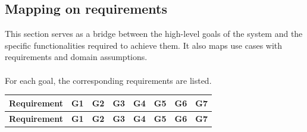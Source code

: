 \subsection{Mapping on requirements}
This section serves as a bridge between the high-level goals of the system and the specific functionalities required to achieve them. It also maps use cases with requirements and domain assumptions.\\\\

For each goal, the corresponding requirements are listed.
\begin{longtable}{lccccccc}
    \hline
    \textbf{Requirement} & \textbf{G1} & \textbf{G2} & \textbf{G3} & \textbf{G4} & \textbf{G5} & \textbf{G6} & \textbf{G7} \\ \hline
    \endfirsthead
    
    \hline
    \textbf{Requirement} & \textbf{G1} & \textbf{G2} & \textbf{G3} & \textbf{G4} & \textbf{G5} & \textbf{G6} & \textbf{G7} \\ \hline
    \endhead
    

\end{longtable}
